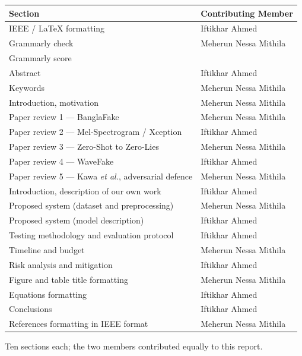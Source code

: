 \documentclass[conference]{IEEEtran}
\begin{document}
\begin{titlepage}
\begin{tabularx}{0.92\textwidth}{@{}>{\raggedright\arraybackslash}X
                                   >{\raggedright\arraybackslash}X@{}}
\toprule
\textbf{Section} & \textbf{Contributing Member} \\
\midrule
IEEE / \LaTeX{} formatting                    & Iftikhar Ahmed \\
Grammarly check                               & Meherun Nessa Mithila \\
Grammarly score                               & 58 \\
Abstract                                      & Iftikhar Ahmed \\
Keywords                                      & Meherun Nessa Mithila \\
Introduction, motivation                      & Meherun Nessa Mithila \\
Paper review 1 --- BanglaFake                 & Meherun Nessa Mithila \\
Paper review 2 --- Mel-Spectrogram / Xception & Iftikhar Ahmed \\
Paper review 3 --- Zero-Shot to Zero-Lies     & Meherun Nessa Mithila \\
Paper review 4 --- WaveFake                   & Iftikhar Ahmed \\
Paper review 5 --- Kawa \emph{et al.}, adversarial defence & Meherun Nessa Mithila \\
Introduction, description of our own work     & Iftikhar Ahmed \\
Proposed system (dataset and preprocessing)   & Meherun Nessa Mithila \\
Proposed system (model description)           & Iftikhar Ahmed \\
Testing methodology and evaluation protocol   & Iftikhar Ahmed \\
Timeline and budget                           & Meherun Nessa Mithila \\
Risk analysis and mitigation                  & Iftikhar Ahmed \\
Figure and table title formatting             & Meherun Nessa Mithila \\
Equations formatting                          & Iftikhar Ahmed \\
Conclusions                                   & Iftikhar Ahmed \\
References formatting in IEEE format          & Meherun Nessa Mithila \\
\bottomrule
\end{tabularx}

\vspace{10pt}
{\small Ten sections each; the two members contributed equally to this report.}

\vfill
\end{titlepage}
\end{document}
